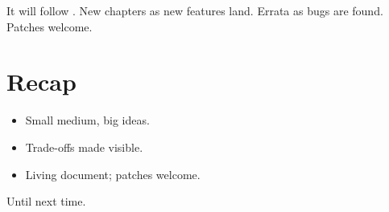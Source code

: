 It will follow \maya{}. New chapters as new features land.
Errata as bugs are found. Patches welcome.

\section{Recap}

\begin{recap}
\begin{itemize}[leftmargin=*]
  \item Small medium, big ideas.
  \item Trade-offs made visible.
  \item Living document; patches welcome.
\end{itemize}
\end{recap}

\medskip

\noindent Until next time.
